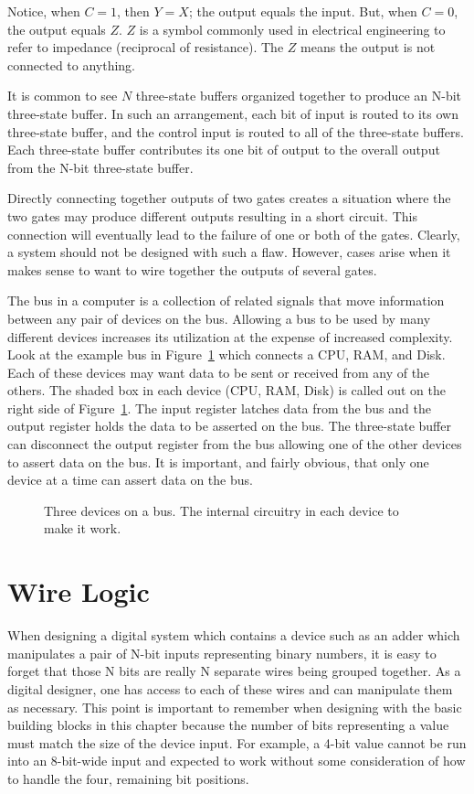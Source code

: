 Notice, when $C=1$, then $Y=X$; the output equals the
input.  But, when $C=0$, the output equals $Z$.  $Z$ is
a symbol commonly used in electrical engineering
to refer to impedance (reciprocal of resistance).  The
$Z$ means the output is not connected to anything.

It is common to see $N$ three-state buffers organized together to
produce an N-bit three-state buffer.  In such an arrangement, 
each bit of input is routed to its own three-state buffer,
and the control input is routed to all of the three-state 
buffers.  Each three-state buffer contributes its one bit 
of output to the overall output from the N-bit three-state
buffer.
 

Directly connecting together outputs of two gates creates
a situation where the two gates may produce different outputs
resulting in a short circuit.  This connection will
eventually lead to the failure of one or both of the gates.
Clearly, a system should not be designed with such a flaw.
However, cases arise when it makes sense to want to wire
together the outputs of several gates.

The bus  in a computer is a collection
of related signals that move information between any pair
of devices on the bus.  Allowing a bus to be used by many
different devices increases its utilization at the expense 
of increased complexity.  Look at the example bus in 
Figure~\ref{fig:comboBBbus} which connects a CPU, RAM, and Disk.
Each of these devices may want data to be sent or
received from any of the others.  The shaded box in each device 
(CPU, RAM, Disk) is called out on the right side of Figure~\ref{fig:comboBBbus}.
The input register latches data from the bus and the output
register holds the data to be asserted on the bus.  The 
three-state buffer can disconnect the output register from the bus 
allowing one of the other devices to assert data on the bus.  
It is important, and fairly obvious, that only one device at a 
time can assert data on the bus.  

\begin{figure}[ht]
\caption{Three devices on a bus.  The internal circuitry in
each device to make it work.}
\label{fig:comboBBbus}
\end{figure}

\section{Wire Logic}
When  designing a digital system which contains a device
such as an adder which manipulates a pair of N-bit inputs representing
binary numbers, it is easy to forget that those N bits are really
N separate wires being grouped together.  As a
digital designer, one has access to each of these wires
and can manipulate them as necessary.  This point is important
to remember when designing with the basic building
blocks in this chapter because the number of bits representing a 
value must match the size of the device input.  For example, 
a 4-bit value cannot be run into an 8-bit-wide input and 
expected to work without some consideration of how to
handle the four, remaining bit positions.

